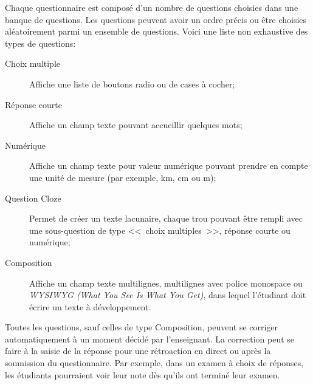 Chaque questionnaire est compos\'e d'un nombre de questions choisies dans une banque de questions.
Les questions peuvent avoir un ordre pr\'ecis ou \^etre choisies al\'eatoirement parmi un ensemble de questions.
Voici une liste non exhaustive des types de questions:
\begin{description}
  \item[Choix multiple]
  
  Affiche une liste de boutons radio ou de cases \`a cocher;
  
  \item[R\'eponse courte]
  
  Affiche un champ texte pouvant accueillir quelques mots;
  
  \item[Num\'erique]
  
  Affiche un champ texte pour valeur num\'erique pouvant prendre en compte une unit\'e de mesure (par exemple, km, cm ou m);
  
  \item[Question Cloze]
  
  Permet de cr\'eer un texte lacunaire, chaque \og trou \fg{} pouvant \^etre rempli avec une sous-question de type <<~choix multiples~>>, r\'eponse courte ou num\'erique;
  
  \item[Composition]
  
  Affiche un champ texte multilignes, multilignes avec police monospace ou \textit{WYSIWYG (What You See Is What You Get)}, dans lequel
  l'\'etudiant doit \'ecrire un texte \`a d\'eveloppement.
\end{description}
Toutes les questions, sauf celles de type Composition, peuvent se corriger automatiquement \`a un moment d\'ecid\'e par l'enseignant.
La correction peut se faire \`a la saisie de la r\'eponse pour une r\'etroaction en direct ou apr\`es la soumission du questionnaire.
Par exemple, dans un examen \`a choix de r\'eponses, les \'etudiants pourraient voir leur note d\`es qu'ils ont termin\'e leur examen.

